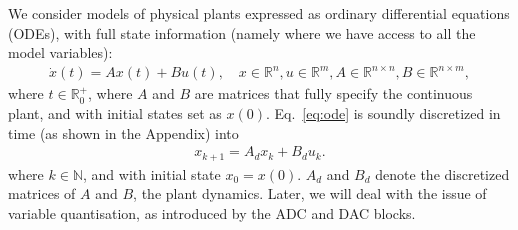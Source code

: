 \documentclass[runningheads,a4paper]{llncs}
\begin{document}
We consider models of physical plants expressed as ordinary differential equations (ODEs), 
with full state information (namely where we have access to all the model variables):  
%
\begin{align}
\label{eq:ode}
\dot{x}(t) = Ax(t)+ B u(t), \quad x \in \mathbb{R}^{n}, u \in \mathbb{R}^m, A \in \mathbb{R}^{n \times n}, B \in \mathbb{R}^{n \times m}, 
\end{align}
where $t \in \mathbb R_0^+$, 
where $A$ and $B$ are matrices that fully specify the continuous plant, 
and with initial states set as $x(0)$. 
Eq.~\eqref{eq:ode} is soundly discretized in time (as shown in the Appendix) into %
%
\begin{align}
\label{eq:plant}
x_{k+1} = A_d x_k+ B_d u_k. 
\end{align} 
where $k \in \mathbb N$, 
and with initial state $x_{0}=x(0)$. $A_d$ and $B_d$ denote the discretized matrices of $A$ and $B$, the plant dynamics. 
Later, we will deal with the issue of variable quantisation, as introduced by the ADC and DAC blocks.  
\end{document}
